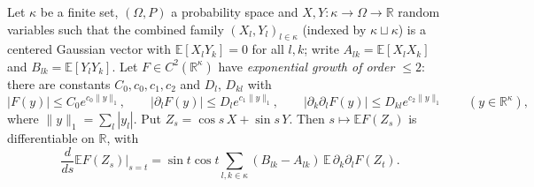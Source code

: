 \begin{lemma}\label{lem:sg-tal:path-derivative}
  \leanok
{}
Let $\kappa$ be a finite set, $(\Omega,P)$ a probability space and $X,Y:\kappa\to\Omega\to\mathbb R$ random variables such that the combined family $(X_l,Y_l)_{l\in\kappa}$ (indexed by $\kappa\sqcup\kappa$)
is a centered Gaussian vector with $\mathbb{E}[X_lY_k]=0$ for all $l,k$; write $A_{lk}=\mathbb{E}[X_lX_k]$ and $B_{lk}=\mathbb{E}[Y_lY_k]$. Let $F\in C^2(\mathbb R^\kappa)$ have \emph{exponential growth of order $\le2$}: there are constants
$C_0,c_0,c_1,c_2$ and $D_l$, $D_{kl}$ with
\[
|F(y)|\le C_0e^{c_0\|y\|_1},\qquad |\partial_lF(y)|\le D_le^{c_1\|y\|_1},\qquad |\partial_k\partial_lF(y)|\le D_{kl}e^{c_2\|y\|_1}\qquad(y\in\mathbb R^\kappa),
\]
where $\|y\|_1=\sum_l|y_l|$. Put $Z_s=\cos s\,X+\sin s\,Y$. Then $s\mapsto\mathbb{E}F(Z_s)$ is differentiable on $\mathbb R$, with
\[
\frac{d}{ds}\mathbb{E}F(Z_s)\Big|_{s=t}=\sin t\cos t\sum_{l,k\in\kappa}(B_{lk}-A_{lk})\,\mathbb{E}\,\partial_k\partial_lF(Z_t).
\]
\end{lemma}
